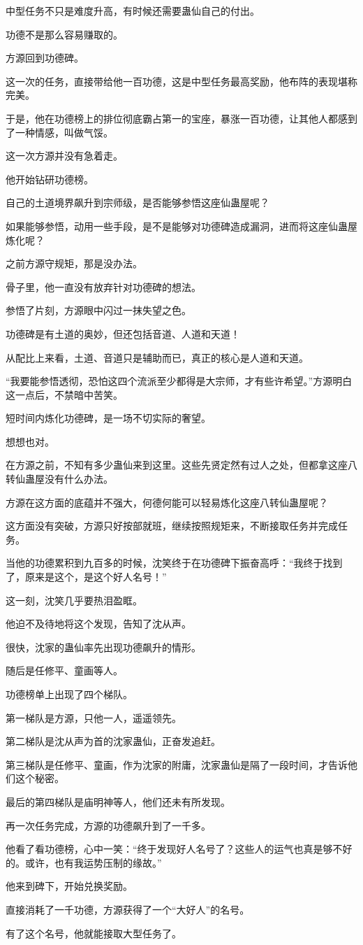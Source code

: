 \begin{this_body}
中型任务不只是难度升高，有时候还需要蛊仙自己的付出。

功德不是那么容易赚取的。

方源回到功德碑。

这一次的任务，直接带给他一百功德，这是中型任务最高奖励，他布阵的表现堪称完美。

于是，他在功德榜上的排位彻底霸占第一的宝座，暴涨一百功德，让其他人都感到了一种情感，叫做气馁。

这一次方源并没有急着走。

他开始钻研功德榜。

自己的土道境界飙升到宗师级，是否能够参悟这座仙蛊屋呢？

如果能够参悟，动用一些手段，是不是能够对功德碑造成漏洞，进而将这座仙蛊屋炼化呢？

之前方源守规矩，那是没办法。

骨子里，他一直没有放弃针对功德碑的想法。

参悟了片刻，方源眼中闪过一抹失望之色。

功德碑是有土道的奥妙，但还包括音道、人道和天道！

从配比上来看，土道、音道只是辅助而已，真正的核心是人道和天道。

“我要能参悟透彻，恐怕这四个流派至少都得是大宗师，才有些许希望。”方源明白这一点后，不禁暗中苦笑。

短时间内炼化功德碑，是一场不切实际的奢望。

想想也对。

在方源之前，不知有多少蛊仙来到这里。这些先贤定然有过人之处，但都拿这座八转仙蛊屋没有什么办法。

方源在这方面的底蕴并不强大，何德何能可以轻易炼化这座八转仙蛊屋呢？

这方面没有突破，方源只好按部就班，继续按照规矩来，不断接取任务并完成任务。

当他的功德累积到九百多的时候，沈笑终于在功德碑下振奋高呼：“我终于找到了，原来是这个，是这个好人名号！”

这一刻，沈笑几乎要热泪盈眶。

他迫不及待地将这个发现，告知了沈从声。

很快，沈家的蛊仙率先出现功德飙升的情形。

随后是任修平、童画等人。

功德榜单上出现了四个梯队。

第一梯队是方源，只他一人，遥遥领先。

第二梯队是沈从声为首的沈家蛊仙，正奋发追赶。

第三梯队是任修平、童画，作为沈家的附庸，沈家蛊仙是隔了一段时间，才告诉他们这个秘密。

最后的第四梯队是庙明神等人，他们还未有所发现。

再一次任务完成，方源的功德飙升到了一千多。

他看了看功德榜，心中一笑：“终于发现好人名号了？这些人的运气也真是够不好的。或许，也有我运势压制的缘故。”

他来到碑下，开始兑换奖励。

直接消耗了一千功德，方源获得了一个“大好人”的名号。

有了这个名号，他就能接取大型任务了。

\end{this_body}

